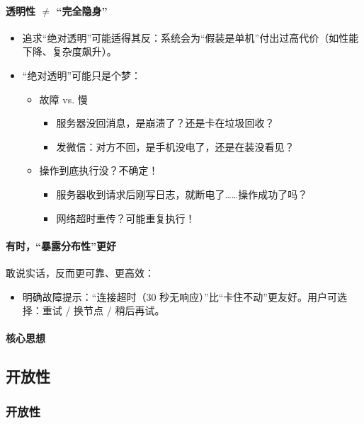 \paragraph{透明性 $\ne$ “完全隐身”}
\begin{itemize}
  \item 追求“绝对透明”可能适得其反：系统会为“假装是单机”付出过高代价（如性能下降、复杂度飙升）。
  \item “绝对透明”可能只是个梦：
  \begin{itemize}
    \item 故障 vs. 慢
    \begin{itemize}
      \item 服务器没回消息，是崩溃了？还是卡在垃圾回收？
      \item 发微信：对方不回，是手机没电了，还是在装没看见？
    \end{itemize}
    \item 操作到底执行没？不确定！
    \begin{itemize}
      \item 服务器收到请求后刚写日志，就断电了……操作成功了吗？
      \item 网络超时重传？可能重复执行！
    \end{itemize}
  \end{itemize}
\end{itemize}

\paragraph{有时，“暴露分布性”更好}
敢说实话，反而更可靠、更高效：
\begin{itemize}
  \item 明确故障提示：“连接超时（30 秒无响应）”比“卡住不动”更友好。用户可选择：重试 / 换节点 / 稍后再试。
\end{itemize}

\paragraph{核心思想}

\subsection{开放性}

\subsubsection*{开放性}

